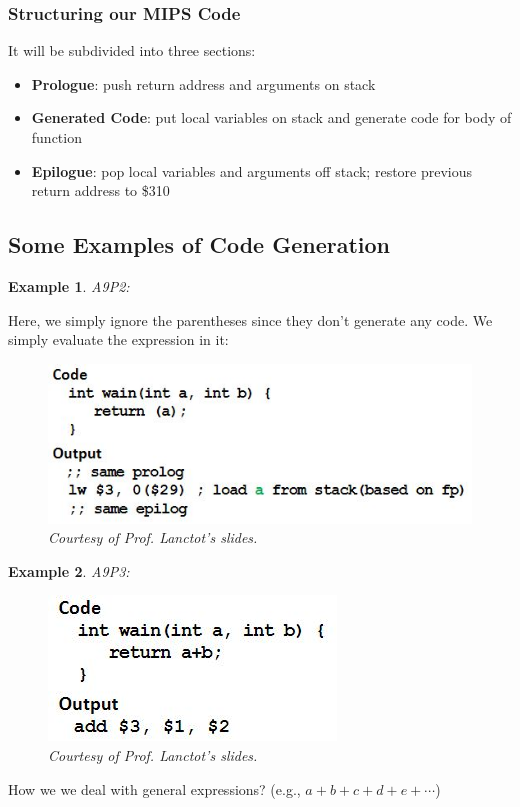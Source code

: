 \documentclass{report}
\newtheorem{ex}{Example}[section]
\begin{document}
\subsubsection{Structuring our MIPS Code}
It will be subdivided into three sections:
\begin{itemize}
\item \textbf{Prologue}: push return address and arguments on stack
\item \textbf{Generated Code}: put local variables on stack and generate code for body of function
\item \textbf{Epilogue}: pop local variables and arguments off stack; restore previous return address to \$310
\end{itemize}
\subsection{Some Examples of Code Generation}
\begin{ex}
A9P2:
\end{ex}
Here, we simply ignore the parentheses since they don't generate any code. We simply evaluate the expression in it:
\begin{figure}[ht]
\begin{center}
\includegraphics[scale=0.6]{a9p2.jpg}
\end{center}
\caption{\textit{Courtesy of Prof. Lanctot's slides.}}
\end{figure}
\begin{ex}
A9P3:
\end{ex}
\begin{figure}[ht]
\begin{center}
\includegraphics[scale=0.5]{a9p3.jpg}
\end{center}
\caption{\textit{Courtesy of Prof. Lanctot's slides.}}
\end{figure}
How we we deal with general expressions? (e.g., $a+b+c+d+e+\cdots$)
\end{document}
